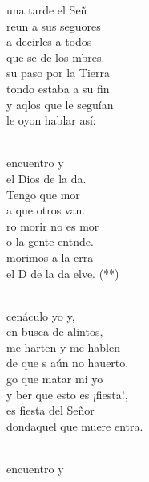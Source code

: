 \documentclass[12pt]{article}
\begin{document}
\begin{multicols*}{2}
\begin{cancion}%
	 una tarde el Señ \\
	reun a sus seguores\\
	a decirles a todos\\
	que se  de los mbres.\\
	 su paso por la Tierra\\
	tondo estaba a su fin\\
	y aqlos que le seguían\\
	le oyon hablar así:\\\jump\\
	\begin{chorus}%
	 encuentro y\\
	 el Dios de la da.\\
	Tengo que mor\\
	a que otros van.\\
	ro morir no es mor\\
	o la gente entnde.\\
	morimos a la erra\\
	el D de la da elve. (**)\\
	\end{chorus}%
	\jump\\
	 cenáculo yo y,\\
	 en busca de alintos,\\
	 me harten y me hablen\\
	de que s aún no hauerto.\\
	go que matar mi yo\\
	y ber que esto es ¡fiesta!,\\
	es fiesta del Señor\\
	dondaquel que muere entra.\\\jump\\
	\begin{chorus}%
	 encuentro y\\

\end{chorus}
\end{cancion}
\end{multicols*}
\end{document}
